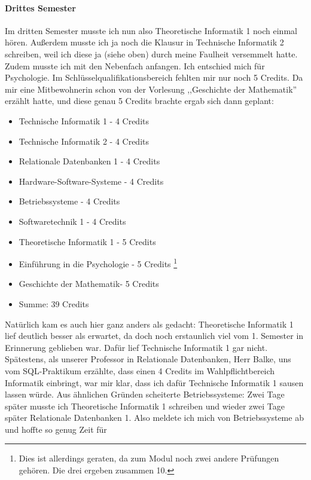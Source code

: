 \paragraph*{Drittes Semester}
Im dritten Semester musste ich nun also Theoretische Informatik 1 noch
einmal hören.  Außerdem musste ich ja noch die Klausur in Technische
Informatik 2 schreiben, weil ich diese ja (siehe oben) durch meine
Faulheit versemmelt hatte. Zudem musste ich mit den Nebenfach
anfangen. Ich entschied mich für Psychologie. Im
Schlüsselqualifikationsbereich fehlten mir nur noch 5 Credits. Da mir
eine Mitbewohnerin 
schon von der Vorlesung ,,Geschichte der Mathematik''  erzählt hatte,
und diese genau 5 Credits brachte ergab sich dann geplant:
\begin{itemize}
\item Technische Informatik 1 - 4 Credits
\item Technische Informatik 2 - 4 Credits
\item Relationale Datenbanken 1 - 4 Credits 
\item Hardware-Software-Systeme - 4 Credits
\item Betriebssysteme - 4 Credits
\item Softwaretechnik 1 - 4 Credits
\item Theoretische Informatik 1 - 5 Credits
\item Einführung in die Psychologie - 5 Credits \footnote{Dies ist
    allerdings geraten, da zum Modul noch zwei andere Prüfungen
    gehören. Die drei ergeben zusammen 10.}
\item Geschichte der Mathematik- 5 Credits
\item Summe: 39 Credits
\end{itemize}
Natürlich kam es auch hier ganz anders als gedacht: Theoretische
Informatik 1 lief deutlich besser als erwartet, da doch noch
erstaunlich viel vom 1. Semester in Erinnerung geblieben war. Dafür
lief Technische Informatik 1 gar nicht. Spätestens, als unserer
Professor in Relationale Datenbanken, Herr Balke, uns vom
SQL-Praktikum erzählte, dass einen 4 Credits im Wahlpflichtbereich
Informatik einbringt, war mir klar, dass ich dafür Technische
Informatik 1 sausen lassen würde. Aus ähnlichen Gründen scheiterte
Betriebssysteme: Zwei Tage später musste ich Theoretische Informatik 1
schreiben und wieder zwei Tage später Relationale Datenbanken 1. Also
meldete ich mich von Betriebssysteme ab und hoffte so genug Zeit für

